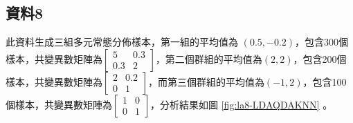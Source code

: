 \subsection{資料8}
此資料生成三組多元常態分佈樣本，第一組的平均值為 $(0.5, -0.2)$，包含300個樣本，共變異數矩陣為$\begin{bmatrix}5 & 0.3 \\0.3 & 2 \end{bmatrix}$，第二個群組的平均值為$(2, 2)$，包含200個樣本，共變異數矩陣為$\begin{bmatrix}2 & 0.2 \\0 & 1 \end{bmatrix}$，而第三個群組的平均值為$(-1, 2)$，包含100個樣本，共變異數矩陣為$\begin{bmatrix}1 & 0 \\0 & 1 \end{bmatrix}$，分析結果如圖 \ref{fig:la8-LDAQDAKNN} 。

